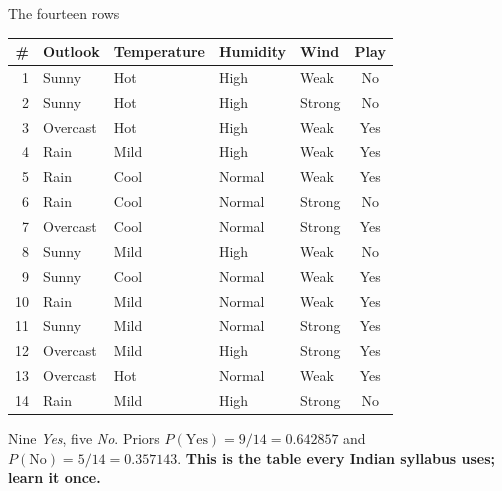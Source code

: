 \documentclass[aspectratio=169]{beamer}
\begin{document}
\begin{frame}[shrink=9]{The fourteen rows}
\begin{center}\scriptsize
\begin{tabular}{@{}rllllc@{}}
  \toprule
  \# & Outlook & Temperature & Humidity & Wind & \textbf{Play}\\
  \midrule
  1 & Sunny & Hot & High & Weak & No\\
  2 & Sunny & Hot & High & Strong & No\\
  3 & Overcast & Hot & High & Weak & Yes\\
  4 & Rain & Mild & High & Weak & Yes\\
  5 & Rain & Cool & Normal & Weak & Yes\\
  6 & Rain & Cool & Normal & Strong & No\\
  7 & Overcast & Cool & Normal & Strong & Yes\\
  8 & Sunny & Mild & High & Weak & No\\
  9 & Sunny & Cool & Normal & Weak & Yes\\
  10 & Rain & Mild & Normal & Weak & Yes\\
  11 & Sunny & Mild & Normal & Strong & Yes\\
  12 & Overcast & Mild & High & Strong & Yes\\
  13 & Overcast & Hot & Normal & Weak & Yes\\
  14 & Rain & Mild & High & Strong & No\\
  \bottomrule
\end{tabular}
\end{center}
\begin{center}\small
  Nine \emph{Yes}, five \emph{No}. Priors
  $P(\text{Yes}) = 9/14 = 0.642857$ and
  $P(\text{No}) = 5/14 = 0.357143$.
  \textbf{This is the table every Indian syllabus uses; learn it once.}
\end{center}
\end{frame}
\end{document}
